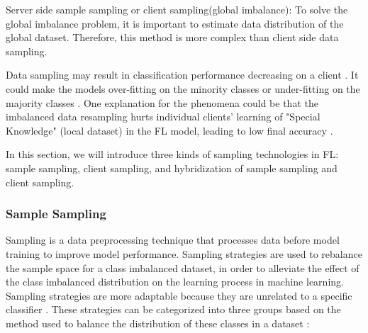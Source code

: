\documentclass[10pt,journal,compsoc]{IEEEtran}
\begin{document}
	Server side sample sampling or client sampling(global imbalance): To solve the global imbalance problem, it is important to estimate data distribution of the global dataset. Therefore, this method is more complex than client side data sampling. 
	
	Data sampling may result in classification performance decreasing on a client \cite{tangdata}. It could make the models over-fitting on the minority classes or under-fitting on the majority classes \cite{cao2019learning}. One explanation for the phenomena could be that the imbalanced data resampling hurts individual clients' learning of "Special Knowledge" (local dataset) in the FL model, leading to low final accuracy \cite{cao2019learning}. 
	
	In this section, we will introduce three kinds of sampling technologies in FL: sample sampling, client sampling, and hybridization of sample sampling and client sampling.
	\subsubsection{Sample Sampling}
	Sampling is a data preprocessing technique that processes data before model training to improve model performance.
	Sampling strategies are used to rebalance the sample space for a class imbalanced dataset, in order to alleviate the effect of the class imbalanced distribution on the learning process in machine learning. Sampling strategies are more adaptable because they are unrelated to a specific classifier \cite{lopez2013insight}. These strategies can be categorized into three groups based on the method used to balance the distribution of these classes in a dataset \cite{haixiang2017learning}:
	
\end{document}

